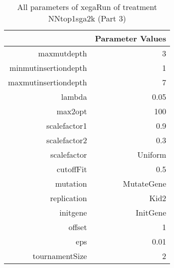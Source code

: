 \begin{table}[ht]
\centering
\begin{tabular}{rr}
  \hline
 & Parameter Values \\ 
  \hline
maxmutdepth & 3 \\ 
  minmutinsertiondepth & 1 \\ 
  maxmutinsertiondepth & 7 \\ 
  lambda & 0.05 \\ 
  max2opt & 100 \\ 
  scalefactor1 & 0.9 \\ 
  scalefactor2 & 0.3 \\ 
  scalefactor & Uniform \\ 
  cutoffFit & 0.5 \\ 
  mutation & MutateGene \\ 
  replication & Kid2 \\ 
  initgene & InitGene \\ 
  offset & 1 \\ 
  eps & 0.01 \\ 
  tournamentSize & 2 \\ 
   \hline
\end{tabular}
\caption{ All parameters of xegaRun of treatment NNtop1sga2k 
 (Part 3)} 
\end{table}
